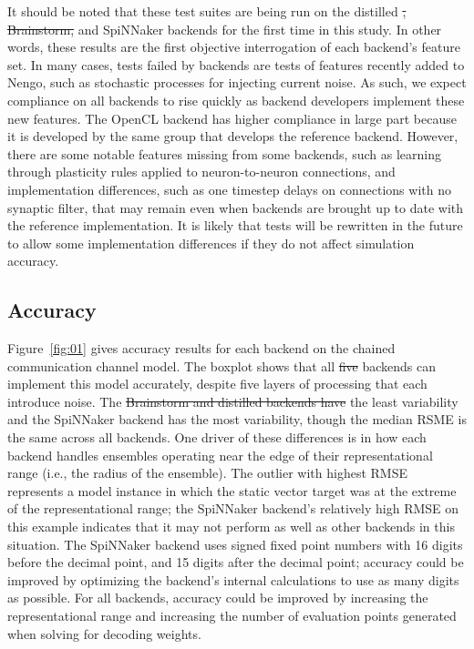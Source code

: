 \documentclass{frontiersSCNS}
\providecommand{\DIFadd}[1]{{\protect\color{blue}\uwave{#1}}} %
\providecommand{\DIFdel}[1]{{\protect\color{red}\sout{#1}}}                      %
\providecommand{\DIFaddbegin}{} %
\providecommand{\DIFaddend}{} %
\providecommand{\DIFdelbegin}{} %
\providecommand{\DIFdelend}{} %
\begin{document}
It should be noted that these test suites
are being run on the distilled
\DIFdelbegin \DIFdel{, Brainstorm,
}\DIFdelend and SpiNNaker backends for the first time in this study.
In other words, these results are the first objective
interrogation of each backend's feature set.
In many cases, tests failed by backends
are tests of features recently added
to Nengo, such as stochastic processes
for injecting current noise.
As such, we expect compliance on all backends
to rise quickly as backend developers
implement these new features.
The OpenCL backend has
higher compliance in large part
because it is developed by the same
group that develops the reference backend.
However, there are some notable features
missing from some backends,
such as learning through plasticity rules
applied to neuron-to-neuron connections,
and implementation differences,
such as one timestep delays on connections
with no synaptic filter,
that may remain even when backends
are brought up to date with
the reference implementation.
It is likely that tests will be rewritten
in the future to allow some implementation differences
if they do not affect simulation accuracy.

\subsection{Accuracy}

Figure~\ref{fig:01} gives accuracy results
for each backend on the chained communication channel model.
The boxplot shows that all \DIFdelbegin \DIFdel{five }\DIFdelend \DIFaddbegin \DIFadd{four }\DIFaddend backends can
implement this model accurately,
despite five layers of processing
that each introduce noise.
The \DIFdelbegin \DIFdel{Brainstorm and distilled backends
have }\DIFdelend \DIFaddbegin \DIFadd{distilled backend
has }\DIFaddend the least variability
and the SpiNNaker backend has the most variability,
though the median RSME is the same across all backends.
One driver of these differences
is in how each backend handles
ensembles operating near the edge
of their representational range
(i.e., the radius of the ensemble).
The outlier with highest RMSE represents
a model instance in which the static vector target
was at the extreme of the representational range;
the SpiNNaker backend's relatively high RMSE
on this example indicates that it
may not perform as well as other backends
in this situation.
The SpiNNaker backend uses
signed fixed point numbers
with 16 digits before the decimal point,
and 15 digits after the decimal point;
accuracy could be improved
by optimizing the backend's
internal calculations to use as
many digits as possible.
For all backends, accuracy could be improved
by increasing the representational range
and increasing the number of evaluation points generated
when solving for decoding weights.
\end{document}
